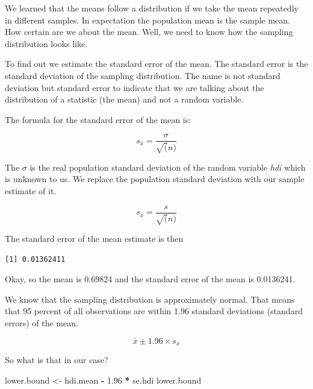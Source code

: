\documentclass[]{book}
\newenvironment{Shaded}{\begin{snugshade}}{\end{snugshade}}
\newcommand{\KeywordTok}[1]{\textcolor[rgb]{0.13,0.29,0.53}{\textbf{#1}}}
\newcommand{\FloatTok}[1]{\textcolor[rgb]{0.00,0.00,0.81}{#1}}
\newcommand{\StringTok}[1]{\textcolor[rgb]{0.31,0.60,0.02}{#1}}
\newcommand{\OperatorTok}[1]{\textcolor[rgb]{0.81,0.36,0.00}{\textbf{#1}}}
\newcommand{\NormalTok}[1]{#1}
\theoremstyle{definition}
\theoremstyle{definition}
\theoremstyle{definition}
\theoremstyle{remark}
\begin{document}
We learned that the means follow a distribution if we take the mean
repeatedly in different samples. In expectation the population mean is
the sample mean. How certain are we about the mean. Well, we need to
know how the sampling distribution looks like.

To find out we estimate the standard error of the mean. The standard
error is the standard deviation of the sampling distribution. The name
is not standard deviation but standard error to indicate that we are
talking about the distribution of a statistic (the mean) and not a
random variable.

The formula for the standard error of the mean is:

\[ s_{\bar{x}} = \frac{ \sigma }{ \sqrt(n) }  \]

The \(\sigma\) is the real population standard deviation of the random
variable \emph{hdi} which is unknown to us. We replace the population
standard deviation with our sample estimate of it.

\[ s_{\bar{x}} = \frac{ s }{ \sqrt(n) }  \]

The standard error of the mean estimate is then

\begin{Shaded}
\end{Shaded}

\begin{verbatim}
[1] 0.01362411
\end{verbatim}

Okay, so the mean is 0.69824 and the standard error of the mean is
0.0136241.

We know that the sampling distribution is approximately normal. That
means that 95 percent of all observations are within 1.96 standard
deviations (standard errors) of the mean.

\[ \bar{x} \pm 1.96 \times s_{\bar{x}} \]

So what is that in our case?

\begin{Shaded}
\begin{Highlighting}[]
\NormalTok{lower.bound <-}\StringTok{ }\NormalTok{hdi.mean }\OperatorTok{-}\StringTok{ }\FloatTok{1.96} \OperatorTok{*}\StringTok{ }\NormalTok{se.hdi}
\NormalTok{lower.bound}
\end{Highlighting}
\end{Shaded}
\end{document}
